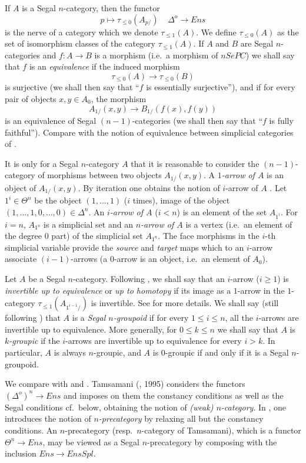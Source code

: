 If $A$ is a Segal $n$-category, then the functor
$$
p\mapsto \tau _{\leq 0} (A_{p/}) \;\;\;\; \Delta ^o \rightarrow Ens
$$
is the nerve of a category which we denote $\tau _{\leq 1}(A)$. We
define $\tau _{\leq 0}(A)$ as the set of isomorphism classes of the
category $\tau _{\leq 1}(A)$. If $A$ and $B$ are Segal $n$-categories
and $f:A\rightarrow B$ is a morphism (i.e.\ a morphism of $nSePC$) we shall
say that
$f$ is an {\em equivalence} if the induced morphism
$$
\tau _{\leq 0}(A)\rightarrow \tau _{\leq 0}(B)
$$
is surjective (we shall then say that ``$f$ is essentially surjective''), and
if for
every pair of objects $x,y\in A_0$, the morphism
$$
A_{1/}(x,y)\rightarrow B_{1/}(f(x), f(y))
$$
is an equivalence of Segal $(n-1)$-categories (we shall then say that
``$f$ is
fully faithful''). Compare with the notion
of equivalence between simplicial categories of
\cite{DwyerKanDiags}.


It is only for a Segal $n$-category $A$ that it is reasonable to
consider
the $(n-1)$-category of morphisms between two objects $A_{1/}(x,y)$.
A {\em $1$-arrow of $A$} is an object of $A_{1/}(x,y)$.
By iteration one obtains the notion of $i$-arrow of $A$ \cite{Tamsamani}.
Let $1^i\in \Theta ^n$ be the object $(1, \ldots , 1)$ ($i$ times), image of
the object
$(1, \ldots , 1, 0,\ldots , 0)\in \Delta ^n$. An {\em $i$-arrow of $A$}
($i<n$) is an element of the set $A_{1^i}$. For $i=n$, $A_{1^n}$ is a
simplicial set and an {\em $n$-arrow of $A$} is a vertex (i.e.\
an element of the degree $0$ part) of the simplicial set
$A_{1^n}$. The face morphisms in the $i$-th simplicial variable
provide the {\em source} and {\em target} maps which to an $i$-arrow
associate $(i-1)$-arrows (a $0$-arrow is an object, i.e.\ an element
of $A_0$).

Let $A$ be a Segal $n$-category.
Following \cite{Tamsamani}, we shall say that an $i$-arrow ($i\geq 1$) is {\em
invertible up to equivalence} or {\em up to homotopy} if its image
as a $1$-arrow in the $1$-category $\tau _{\leq 1}(A_{1^{i-1}/})$ is
invertible. See \cite{Tamsamani} for more details. We shall say (still
following \cite{Tamsamani}) that $A$ is a {\em Segal $n$-groupoid}
if for
every $1\leq i\leq n$, all the $i$-arrows are invertible up to
equivalence. More generally, for $0\leq k \leq n$ we shall say that $A$ is
{\em $k$-groupic} if the $i$-arrows are invertible up to
equivalence for every $i>k$. In particular, $A$ is always $n$-groupic, and
$A$ is $0$-groupic if and only if it is a Segal $n$-groupoid.

We compare with \cite{Tamsamani} and \cite{Dunn}. Tamsamani
(\cite{Tamsamani}, 1995)
considers the functors $(\Delta ^o)^n\rightarrow Ens$ and imposes on them the
constancy conditions as well as the Segal conditions cf.\ below,
obtaining the notion of {\em (weak) $n$-category}. In \cite{nCAT},
one introduces the notion of {\em $n$-precategory} by relaxing all but the
constancy conditions.
An $n$-precategory (resp.\ $n$-category of Tamsamani),
which is a functor $\Theta ^n\rightarrow Ens$, may be viewed as a
Segal $n$-precategory by composing with the inclusion $Ens\rightarrow EnsSpl$.


